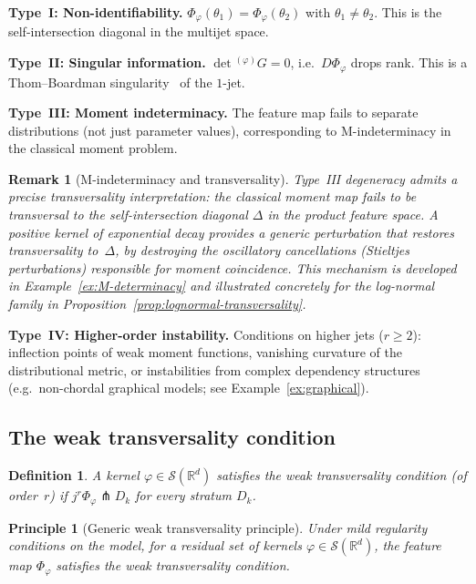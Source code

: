 \documentclass[11pt,a4paper]{article}
\newtheorem{principle}[theorem]{Principle}
\newtheorem{definition}[theorem]{Definition}
\newtheorem{remark}[theorem]{Remark}
\newcommand{\R}{\mathbb{R}}
\newcommand{\cS}{\mathcal{S}}
\newcommand{\wG}{{}^{(\varphi)}\!G}
\begin{document}
\textbf{Type~I: Non-identifiability.}
$\Phi_\varphi(\theta_1)=\Phi_\varphi(\theta_2)$ with
$\theta_1\neq\theta_2$.  This is the self-intersection diagonal in
the multijet space.

\textbf{Type~II: Singular information.}
$\det\wG = 0$, i.e.\ $D\Phi_\varphi$ drops rank.  This is a
Thom--Boardman singularity~\cite{Boardman1967} of the $1$-jet.

\textbf{Type~III: Moment indeterminacy.}
The feature map fails to separate distributions (not just parameter
values), corresponding to M-indeterminacy in the classical moment
problem.

\begin{remark}[M-indeterminacy and transversality]
\label{rem:M-indeterminacy-transversality}
Type~III degeneracy admits a precise transversality interpretation:
the classical moment map fails to be transversal to the
self-intersection diagonal $\Delta$ in the product feature space.  A
positive kernel of exponential decay provides a generic perturbation
that restores transversality to~$\Delta$, by destroying the
oscillatory cancellations (Stieltjes perturbations) responsible for
moment coincidence.  This mechanism is developed in
Example~\ref{ex:M-determinacy} and illustrated concretely for the
log-normal family in
Proposition~\ref{prop:lognormal-transversality}.
\end{remark}

\textbf{Type~IV: Higher-order instability.}
Conditions on higher jets ($r\ge 2$): inflection points of weak
moment functions, vanishing curvature of the distributional metric,
or instabilities from complex dependency structures (e.g.\ non-chordal
graphical models; see Example~\ref{ex:graphical}).

\subsection{The weak transversality condition}

\begin{definition}
\label{def:weak_transversality}
A kernel $\varphi\in\cS(\R^d)$ satisfies the \emph{weak
transversality condition} (of order~$r$) if
$j^r\Phi_\varphi \pitchfork D_k$ for every stratum $D_k$.
\end{definition}

\begin{principle}[Generic weak transversality principle]
\label{conj:generic}
Under mild regularity conditions on the model, for a residual set of
kernels $\varphi\in\cS(\R^d)$, the feature map $\Phi_\varphi$
satisfies the weak transversality condition.
\end{principle}
\end{document}
